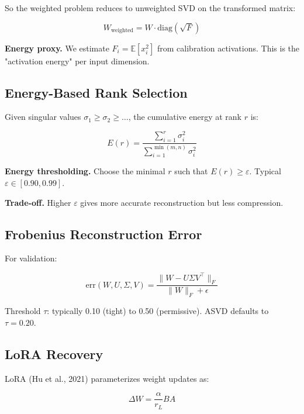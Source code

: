 So the weighted problem reduces to unweighted SVD on the transformed matrix:

\begin{equation}
W_\text{weighted} = W \cdot \text{diag}(\sqrt{F})
\end{equation}

\textbf{Energy proxy.} We estimate $F_i = \mathbb{E}[x_i^2]$ from calibration 
activations. This is the "activation energy" per input dimension.

\subsection{Energy-Based Rank Selection}

Given singular values $\sigma_1 \geq \sigma_2 \geq \dots$, the cumulative 
energy at rank $r$ is:

\begin{equation}
E(r) = \frac{\sum_{i=1}^r \sigma_i^2}{\sum_{i=1}^{\min(m, n)} \sigma_i^2}
\end{equation}

\textbf{Energy thresholding.} Choose the minimal $r$ such that $E(r) \geq \varepsilon$. 
Typical $\varepsilon \in [0.90, 0.99]$.

\textbf{Trade-off.} Higher $\varepsilon$ gives more accurate reconstruction but 
less compression.

\subsection{Frobenius Reconstruction Error}

For validation:

\begin{equation}
\text{err}(W, U, \Sigma, V) = \frac{\|W - U \Sigma V^\top\|_F}{\|W\|_F + \epsilon}
\end{equation}

Threshold $\tau$: typically 0.10 (tight) to 0.50 (permissive). ASVD 
defaults to $\tau = 0.20$.

\subsection{LoRA Recovery}

LoRA (Hu et al., 2021) parameterizes weight updates as:

\begin{equation}
\Delta W = \frac{\alpha}{r_L} B A
\end{equation}

